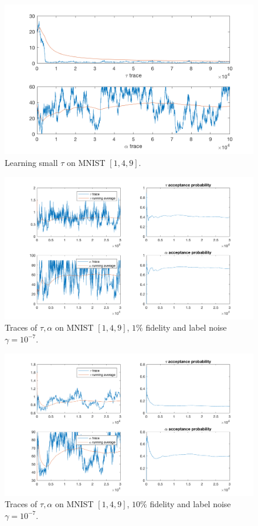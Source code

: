 \documentclass{siamart1116}
\begin{document}
        \begin{figure}[!htb]
        \centering
        \caption{\label{ta_mnist_1}Learning small $\tau$ on MNIST $[1, 4, 9]$.}
        \includegraphics[width=0.8\linewidth]{choose_hyp/t_a/learn_tau.png}
        \end{figure}

        \begin{figure}[!htb]
        \centering
        \caption{\label{ta_mnist_2}Traces of $\tau, \alpha$ on MNIST $[1, 4, 9]$, $1\%$ fidelity and label noise $\gamma = 10^{-7}$.}
        \includegraphics[width=0.8\linewidth]{choose_hyp/t_a/one_fidelity.png}
        \end{figure}

        \begin{figure}[!htb]
        \centering
        \caption{\label{ta_mnist_3}Traces of $\tau, \alpha$ on MNIST $[1, 4, 9]$, $10\%$ fidelity and label noise $\gamma = 10^{-7}$.}
        \includegraphics[width=0.8\linewidth]{choose_hyp/t_a/ten_fidelity.png}
        \end{figure}
\end{document}

